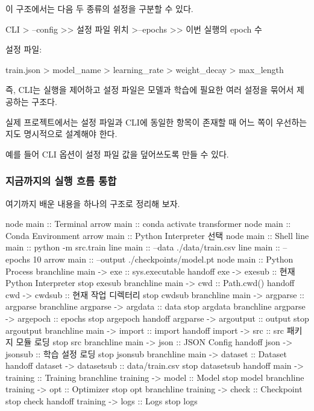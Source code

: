 이 구조에서는 다음 두 종류의 설정을 구분할 수 있다.

\begin{dhkdir}[in=6]
CLI
> --config
>> 설정 파일 위치
>--epochs
>> 이번 실행의 epoch 수
\end{dhkdir}

설정 파일:

\begin{dhkdir}[in=6]
train.json
> model_name
> learning_rate
> weight_decay
> max_length
\end{dhkdir}

즉, CLI는 실행을 제어하고 설정 파일은 모델과 학습에 필요한 여러 설정을 묶어서 제공하는 구조다.

실제 프로젝트에서는 설정 파일과 CLI에 동일한 항목이 존재할 때 어느 쪽이 우선하는지도 명시적으로 설계해야 한다.

예를 들어 CLI 옵션이 설정 파일 값을 덮어쓰도록 만들 수 있다.

\subsubsection{지금까지의 실행 흐름 통합}

여기까지 배운 내용을 하나의 구조로 정리해 보자.

\begin{dhkbranch}[in=8]
node main :: Terminal
arrow main :: conda activate transformer
node main :: Conda Environment
arrow main :: Python Interpreter 선택
node main :: Shell
line main :: python -m src.train
line main ::   --data ./data/train.csv
line main ::   --epochs 10
arrow main ::   --output ./checkpoints/model.pt
node main :: Python Process
branchline main -> exe :: sys.executable
handoff exe -> exesub :: 현재 Python Interpreter
stop exesub
branchline main -> cwd :: Path.cwd()
handoff cwd -> cwdsub :: 현재 작업 디렉터리
stop cwdsub
branchline main -> argparse :: argparse
branchline argparse -> argdata :: data
stop argdata
branchline argparse -> argepoch :: epochs
stop argepoch
handoff argparse -> argoutput :: output
stop argoutput
branchline main -> import :: import
handoff import -> src :: src 패키지 모듈 로딩
stop src
branchline main -> json :: JSON Config
handoff json -> jsonsub :: 학습 설정 로딩
stop jsonsub
branchline main -> dataset :: Dataset
handoff dataset -> datasetsub :: data/train.csv
stop datasetsub
handoff main -> training :: Training
branchline training -> model :: Model
stop model
branchline training -> opt :: Optimizer
stop opt
branchline training -> check :: Checkpoint
stop check
handoff training -> logs :: Logs
stop logs
\end{dhkbranch}

